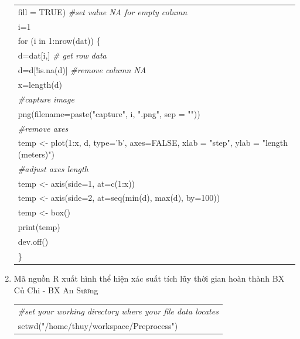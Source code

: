 \documentclass[a4paper, 13pt]{report}
\begin{document}
\begin{enumerate}[label=\textbf{PL\arabic*}]
\begin{flushleft}
\begin{tabular}{ |l| }
\hspace{2cm} fill = TRUE) \textit{\#set value NA for empty column}\\
i=1\\
for (i in 1:nrow(dat)) \{ \\
  \hspace{1cm} d=dat[i,] \textit{\# get row data}\\
  \hspace{1cm} d=d[!is.na(d)] \textit{\#remove column NA}\\
  \hspace{1cm} x=length(d)\\
  \hspace{1cm} \textit{\#capture image}\\
  \hspace{1cm} png(filename=paste("capture", i, ".png", sep = ""))\\
  \hspace{1cm} \textit{\#remove axes}\\
  \hspace{1cm} temp <- plot(1:x, d, type='b', axes=FALSE, xlab = "step", ylab = "length (meters)")\\
  \hspace{1cm} \textit{\#adjust axes length}\\  
  \hspace{1cm} temp <- axis(side=1, at=c(1:x))\\
  \hspace{1cm} temp <- axis(side=2, at=seq(min(d), max(d), by=100))\\
  \hspace{1cm} temp <- box()\\
  \hspace{1cm} print(temp)\\
  \hspace{1cm} dev.off()\\
  \}
\\
\hline
\end{tabular}
\end{flushleft}
\item \label{xacsuatTLTGHT} Mã nguồn R xuất hình thể hiện xác suất tích lũy thời gian hoàn thành BX Củ Chi - BX An Sương\\
\begin{flushleft}
\begin{tabular}{ |l| }
\hline
\textit{\#set your working directory where your file data locates}\\
setwd("/home/thuy/workspace/Preprocess")\\

\end{tabular}
\end{flushleft}
\end{enumerate}
\end{document}
